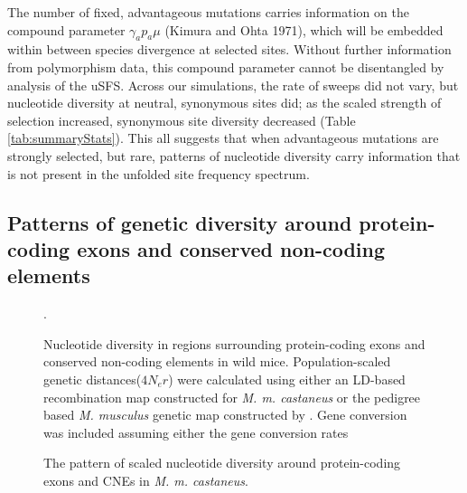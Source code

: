 	The number of fixed, advantageous mutations carries information on the compound parameter $\gamma_a p_a \mu$ (Kimura and Ohta 1971), which will be embedded within between species divergence at selected sites. Without further information from polymorphism data, this compound parameter cannot be disentangled by analysis of the uSFS. Across our simulations, the rate of sweeps did not vary, but nucleotide diversity at neutral, synonymous sites did; as the scaled strength of selection increased, synonymous site diversity decreased (Table \ref{tab:summaryStats}). This all suggests that when advantageous mutations are strongly selected, but rare, patterns of nucleotide diversity carry information that is not present in the unfolded site frequency spectrum.

\subsection*{Patterns of genetic diversity around protein-coding exons and conserved non-coding elements}

\begin{figure}[h]
   \centering      
   \noindent{}
 \caption{Nucleotide diversity in regions surrounding protein-coding exons and conserved non-coding elements in wild mice. Population-scaled genetic distances($4N_er$) were calculated using either an LD-based recombination map constructed for \textit{M. m. castaneus} or the pedigree based \textit{M. musculus} genetic map constructed by \cite{RN232}. Gene conversion was included assuming either the gene conversion rates }.
 
 \label{fig:sfsExample}
\end{figure}

\linespread{2}
\begin{figure}[h]
   \centering      
   \noindent{}
 \caption{The pattern of scaled nucleotide diversity around protein-coding exons and CNEs in \textit{M. m. castaneus}.}  
 
 \label{fig:castaneusFit}
\end{figure}

